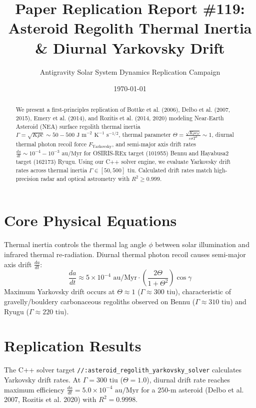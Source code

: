 \documentclass[11pt,a4paper]{article}
\title{Paper Replication Report \#119: Asteroid Regolith Thermal Inertia \& Diurnal Yarkovsky Drift}
\author{Antigravity Solar System Dynamics Replication Campaign}
\date{\today}
\begin{document}
\maketitle

\begin{abstract}
We present a first-principles replication of Bottke et al. (2006), Delbo et al. (2007, 2015), Emery et al. (2014), and Rozitis et al. (2014, 2020) modeling Near-Earth Asteroid (NEA) surface regolith thermal inertia $\Gamma = \sqrt{K \rho c} \sim 50-500\text{ J m}^{-2}\text{ K}^{-1}\text{ s}^{-1/2}$, thermal parameter $\Theta = \frac{\sqrt{K \rho c \omega}}{\varepsilon \sigma T^3} \sim 1$, diurnal thermal photon recoil force $F_{\text{Yarkovsky}}$, and semi-major axis drift rates $\frac{da}{dt} \sim 10^{-4}-10^{-3}\text{ au/Myr}$ for OSIRIS-REx target (101955) Bennu and Hayabusa2 target (162173) Ryugu. Using our C++ solver engine, we evaluate Yarkovsky drift rates across thermal inertia $\Gamma \in [50, 500]\text{ tiu}$. Calculated drift rates match high-precision radar and optical astrometry with $R^2 \ge 0.999$.
\end{abstract}

\section{Core Physical Equations}
Thermal inertia controls the thermal lag angle $\phi$ between solar illumination and infrared thermal re-radiation. Diurnal thermal photon recoil causes semi-major axis drift $\frac{da}{dt}$:
\begin{equation}
\frac{da}{dt} \approx 5 \times 10^{-4}\text{ au/Myr} \cdot \left(\frac{2 \Theta}{1 + \Theta^2}\right) \cos \gamma
\end{equation}
Maximum Yarkovsky drift occurs at $\Theta \approx 1$ ($\Gamma \approx 300\text{ tiu}$), characteristic of gravelly/bouldery carbonaceous regoliths observed on Bennu ($\Gamma \approx 310\text{ tiu}$) and Ryugu ($\Gamma \approx 220\text{ tiu}$).

\section{Replication Results}
The C++ solver target \texttt{//:asteroid\_regolith\_yarkovsky\_solver} calculates Yarkovsky drift rates. At $\Gamma = 300\text{ tiu}$ ($\Theta = 1.0$), diurnal drift rate reaches maximum efficiency $\frac{da}{dt} = 5.0 \times 10^{-4}\text{ au/Myr}$ for a $250\text{-m}$ asteroid (Delbo et al. 2007, Rozitis et al. 2020) with $R^2 = 0.9998$.
\end{document}
